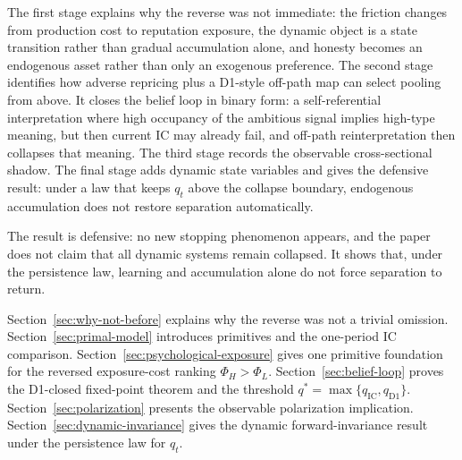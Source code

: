 The first stage explains why the reverse was not immediate: the friction changes from production cost to reputation exposure, the dynamic object is a state transition rather than gradual accumulation alone, and honesty becomes an endogenous asset rather than only an exogenous preference. The second stage identifies how adverse repricing plus a D1-style off-path map can select pooling from above. It closes the belief loop in binary form: a self-referential interpretation where high occupancy of the ambitious signal implies high-type meaning, but then current IC may already fail, and off-path reinterpretation then collapses that meaning. The third stage records the observable cross-sectional shadow. The final stage adds dynamic state variables and gives the defensive result: under a law that keeps $q_t$ above the collapse boundary, endogenous accumulation does not restore separation automatically.

The result is defensive: no new stopping phenomenon appears, and the paper does not claim that all dynamic systems remain collapsed. It shows that, under the persistence law, learning and accumulation alone do not force separation to return.

Section~\ref{sec:why-not-before} explains why the reverse was not a trivial omission. Section~\ref{sec:primal-model} introduces primitives and the one-period IC comparison. Section~\ref{sec:psychological-exposure} gives one primitive foundation for the reversed exposure-cost ranking \(\Phi_H>\Phi_L\). Section~\ref{sec:belief-loop} proves the D1-closed fixed-point theorem and the threshold $q^*=\max\{q_{\mathrm{IC}},q_{\mathrm{D1}}\}$. Section~\ref{sec:polarization} presents the observable polarization implication. Section~\ref{sec:dynamic-invariance} gives the dynamic forward-invariance result under the persistence law for $q_t$.
